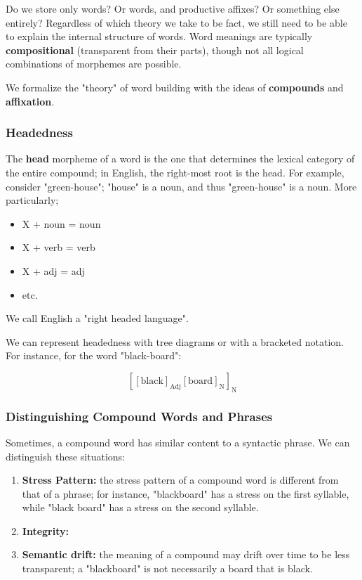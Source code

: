 \documentclass[12pt]{article}
\begin{document}
Do we store only words? Or words, and productive affixes? Or something else entirely? Regardless of which theory we take to be fact, we still need to be able to explain the internal structure of words. Word meanings are typically \textbf{compositional} (transparent from their parts), though not all logical combinations of morphemes are possible. 

We formalize the "theory" of word building with the ideas of \textbf{compounds} and \textbf{affixation}.

\subsubsection{Headedness}
The \textbf{head} morpheme of a word is the one that determines the lexical category of the entire compound; in English, the right-most root is the head. For example, consider "green-house"; "house" is a noun, and thus "green-house" is a noun. More particularly; \begin{itemize}
  \item X + noun = noun
  \item X + verb = verb
  \item X + adj = adj
  \item etc.
\end{itemize}
We call English a "right headed language".

We can represent headedness with tree diagrams or with a bracketed notation. For instance, for the word "black-board":

\[[[\text{black}]_{\text{Adj}}[\text{board}]_{\text{N}}]_{\text{N}}\]

\begin{center} 
  \end{center}

\subsubsection{Distinguishing Compound Words and Phrases}

Sometimes, a compound word has similar content to a syntactic phrase. We can distinguish these situations:

\begin{enumerate}
  \item \textbf{Stress Pattern:} the stress pattern of a compound word is different from that of a phrase; for instance, "blackboard" has a stress on the first syllable, while "black board" has a stress on the second syllable.
  \item \textbf{Integrity:} %
  \item \textbf{Semantic drift:} the meaning of a compound may drift over time to be less transparent; a "blackboard" is not necessarily a board that is black.
\end{enumerate}
\end{document}
